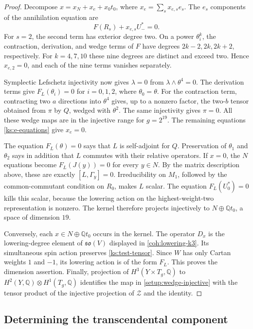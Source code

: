 \documentclass[11pt]{article}
\numberwithin{equation}{section}
\theoremstyle{definition}
\theoremstyle{remark}
\newcommand{\Q}{\mathbb Q}
\begin{document}
\begin{proof}
Decompose
$x=x_N+x_e+x_0t_0$, where $x_e=\sum_sx_{e,s}e_s$.
The $e_s$ components of the annihilation equation are
\begin{equation}
 \label{ks:e-equations}
 F(R_s)+x_{e,s}U_-^*=0.
\end{equation}
For $s=2$, the second term has exterior degree two.  On a
power $\theta_i^k$, the contraction, derivation, and wedge
terms of $F$ have degrees $2k-2,2k,2k+2$, respectively.
For $k=4,7,10$ these nine degrees are distinct and exceed
two.  Hence $x_{e,2}=0$, and each of the nine terms vanishes
separately.

Symplectic Lefschetz injectivity now gives $\lambda=0$ from
$\lambda\wedge\theta^4=0$.  The derivation terms give
$F_L(\theta_i)=0$ for $i=0,1,2$, where $\theta_0=\theta$.
For the contraction term, contracting two $a$ directions into
$\theta^4$ gives, up to a nonzero factor, the two-$b$ tensor
obtained from $\pi$ by $Q$, wedged with $\theta^2$.
The same injectivity gives $\pi=0$.  All these wedge maps
are in the injective range for $g=2^{19}$.  The remaining
equations \eqref{ks:e-equations} give $x_e=0$.

The equation $F_L(\theta)=0$ says that $L$ is self-adjoint
for $Q$.  Preservation of $\theta_1$ and $\theta_2$ says
in addition that $L$ commutes with their relative operators.
If $x=0$, the $N$ equations become
$F_L(J(y))=0$ for every $y\in N$.  By the matrix description
above, these are exactly
$[L,\Gamma_y]=0$.  Irreducibility on $M_1$, followed by
the common-commutant condition on $R_0$, makes $L$ scalar.
The equation $F_L(U_0^*)=0$ kills this scalar, because
the lowering action on the highest-weight-two representation
is nonzero.  The kernel therefore projects injectively to
$N\oplus\Q t_0$, a space of dimension $19$.

Conversely, each $x\in N\oplus\Q t_0$ occurs in the kernel.
The operator $D_x$ is the lowering-degree element of
$\mathfrak{so}(V)$ displayed in \eqref{coh:lowering-k3}.
Its simultaneous spin action preserves \eqref{ks:test-tensor}.
Since $W$ has only Cartan weights $1$ and $-1$, its lowering
action is of the form $F_L$.  This proves the dimension
assertion.  Finally, projection of $H^3(Y\times T_g,\Q)$
to $H^2(Y,\Q)\otimes H^1(T_g,\Q)$ identifies the map in
\eqref{setup:wedge-injective} with the tensor product of
the injective projection of $\mathcal Z$ and the identity.
\end{proof}

\subsection{Determining the transcendental component}
\label{ks:exactness-section}
\end{document}
